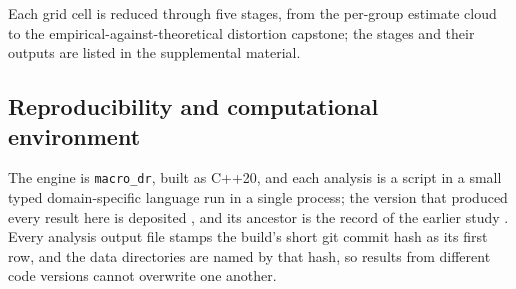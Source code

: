 Each grid cell is reduced through five stages, from the per-group estimate cloud to the
empirical-against-theoretical distortion capstone; the stages and their outputs are listed in
the supplemental material.

\subsection*{Reproducibility and computational environment}

The engine is \texttt{macro\_dr}, built as C++20, and each analysis is a script in a
small typed domain-specific language run in a single process; the version that produced
every result here is deposited \citep{moffatt2026code}, and its ancestor is the record of
the earlier study \citep{moffatt2025macroir}. Every analysis output file stamps the build's short git commit hash
as its first row, and the data directories are named by that hash, so results from different code
versions cannot overwrite one another.

